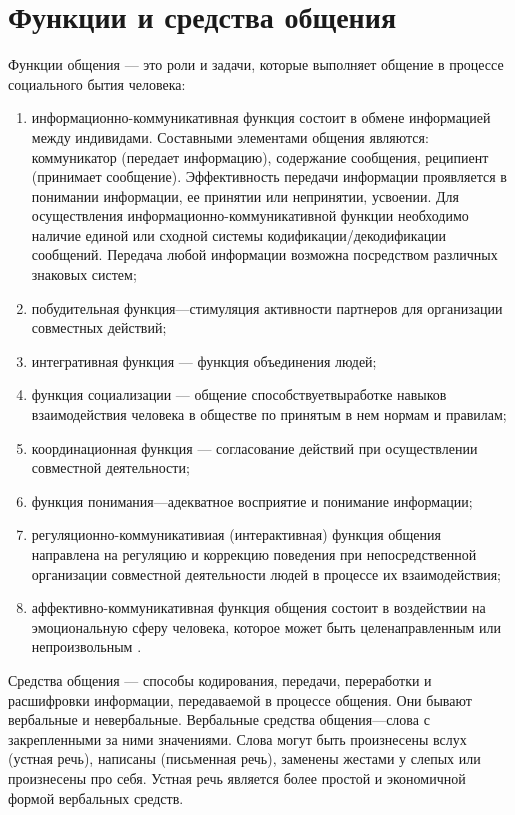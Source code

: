 \section{Функции и средства общения}
Функции общения — это роли и задачи, которые выполняет общение в процессе социального бытия человека:  
\begin{enumerate}
	\item информационно-коммуникативная функция состоит в обмене информацией между индивидами. Составными элементами общения являются: коммуникатор (передает информацию), содержание сообщения, реципиент (принимает сообщение). Эффективность передачи информации проявляется в понимании информации, ее принятии или непринятии, усвоении. Для осуществления информационно-коммуникативной функции необходимо наличие единой или сходной системы кодификации/декодификации сообщений. Передача любой информации возможна посредством различных знаковых систем;
	\item побудительная функция—стимуляция активности партнеров для организации совместных действий;
	\item интегративная функция — функция объединения людей;
	\item функция социализации — общение способствуетвыработке навыков взаимодействия человека в обществе по принятым в нем нормам и правилам;
	\item координационная функция — согласование действий при осуществлении совместной деятельности;
	\item функция понимания—адекватное восприятие и понимание информации;
	\item регуляционно-коммуникативиая (интерактивная) функция общения направлена на регуляцию и коррекцию поведения при непосредственной организации совместной деятельности людей в процессе их взаимодействия;
	\item аффективно-коммуникативная функция общения состоит в воздействии на эмоциональную сферу человека, которое может быть целенаправленным или непроизвольным \cite{28}. 
\end{enumerate}

Средства общения — способы кодирования, передачи, переработки и расшифровки информации, передаваемой в процессе общения. Они бывают вербальные и невербальные. Вербальные средства общения—слова с закрепленными за ними значениями. Слова могут быть произнесены вслух (устная речь), написаны (письменная речь), заменены жестами у слепых или произнесены про себя. Устная речь является более простой и экономичной формой вербальных средств.

